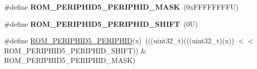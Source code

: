 \begin{DoxyCompactItemize}
\mbox{\label{group___m_t_b___register___masks_ga39e8a3441c79c42651efba9100e653a7}} 
\#define {\bfseries R\+O\+M\+\_\+\+P\+E\+R\+I\+P\+H\+I\+D5\+\_\+\+P\+E\+R\+I\+P\+H\+I\+D\+\_\+\+M\+A\+SK}~(0x\+F\+F\+F\+F\+F\+F\+F\+F\+U)
\item 
\mbox{\label{group___m_t_b___register___masks_ga083194b41cf1109fe5a6e235b2c1f89a}} 
\#define {\bfseries R\+O\+M\+\_\+\+P\+E\+R\+I\+P\+H\+I\+D5\+\_\+\+P\+E\+R\+I\+P\+H\+I\+D\+\_\+\+S\+H\+I\+FT}~(0\+U)
\item 
\#define \mbox{\hyperlink{group___m_t_b___register___masks_gaa801210cd537086eddf2456575251d93}{R\+O\+M\+\_\+\+P\+E\+R\+I\+P\+H\+I\+D5\+\_\+\+P\+E\+R\+I\+P\+H\+ID}}(x)~(((uint32\+\_\+t)(((uint32\+\_\+t)(x)) $<$$<$ R\+O\+M\+\_\+\+P\+E\+R\+I\+P\+H\+I\+D5\+\_\+\+P\+E\+R\+I\+P\+H\+I\+D\+\_\+\+S\+H\+I\+FT)) \& R\+O\+M\+\_\+\+P\+E\+R\+I\+P\+H\+I\+D5\+\_\+\+P\+E\+R\+I\+P\+H\+I\+D\+\_\+\+M\+A\+SK)
\end{DoxyCompactItemize}
